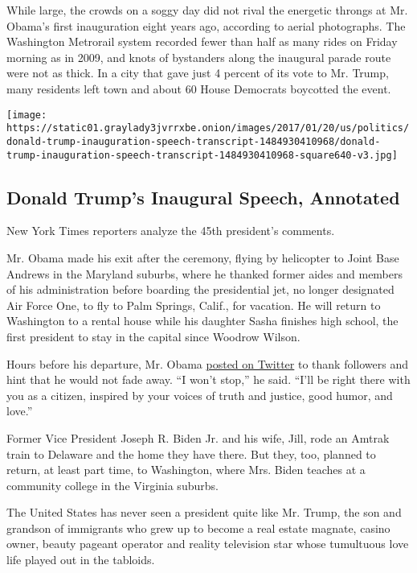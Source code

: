 While large, the crowds on a soggy day did not rival the energetic
throngs at Mr. Obama's first inauguration eight years ago, according to
aerial photographs. The Washington Metrorail system recorded fewer than
half as many rides on Friday morning as in 2009, and knots of bystanders
along the inaugural parade route were not as thick. In a city that gave
just 4 percent of its vote to Mr. Trump, many residents left town and
about 60 House Democrats boycotted the event.

\href{https://www.nytimes3xbfgragh.onion/interactive/2017/01/20/us/politics/donald-trump-inauguration-speech-transcript.html}{}

\texttt{[image: https://static01.graylady3jvrrxbe.onion/images/2017/01/20/us/politics/donald-trump-inauguration-speech-transcript-1484930410968/donald-trump-inauguration-speech-transcript-1484930410968-square640-v3.jpg]}

\hypertarget{donald-trumps-inaugural-speech-annotated}{%
\subsection{Donald Trump's Inaugural Speech,
Annotated}\label{donald-trumps-inaugural-speech-annotated}}

New York Times reporters analyze the 45th president's comments.

Mr. Obama made his exit after the ceremony, flying by helicopter to
Joint Base Andrews in the Maryland suburbs, where he thanked former
aides and members of his administration before boarding the presidential
jet, no longer designated Air Force One, to fly to Palm Springs, Calif.,
for vacation. He will return to Washington to a rental house while his
daughter Sasha finishes high school, the first president to stay in the
capital since Woodrow Wilson.

Hours before his departure, Mr. Obama
\href{https://twitter.com/POTUS44/status/822446040729157632}{posted on
Twitter} to thank followers and hint that he would not fade away. ``I
won't stop,'' he said. ``I'll be right there with you as a citizen,
inspired by your voices of truth and justice, good humor, and love.''

Former Vice President Joseph R. Biden Jr. and his wife, Jill, rode an
Amtrak train to Delaware and the home they have there. But they, too,
planned to return, at least part time, to Washington, where Mrs. Biden
teaches at a community college in the Virginia suburbs.

The United States has never seen a president quite like Mr. Trump, the
son and grandson of immigrants who grew up to become a real estate
magnate, casino owner, beauty pageant operator and reality television
star whose tumultuous love life played out in the tabloids.

